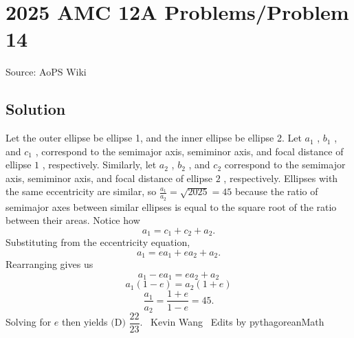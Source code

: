 \documentclass[12pt]{article}
\begin{document}
\section*{{2025 AMC 12A Problems/Problem 14}}
Source: AoPS Wiki

\subsection*{Solution}
Let the outer ellipse be ellipse 1, and the inner ellipse be ellipse 2. Let $a_1$ , $b_1$ , and $c_1$ , correspond to the semimajor axis, semiminor axis, and focal distance of ellipse $1$ , respectively. Similarly, let $a_2$ , $b_2$ , and $c_2$ correspond to the semimajor axis, semiminor axis, and focal distance of ellipse $2$ , respectively. Ellipses with the same eccentricity are similar, so $\frac{a_1}{a_2} = \sqrt{2025} = 45$ because the ratio of semimajor axes between similar ellipses is equal to the square root of the ratio between their areas. Notice how \[a_1 = c_1 + c_2 + a_2.\] Substituting from the eccentricity equation, \[a_1 = ea_1 + ea_2 + a_2.\] Rearranging gives us \[a_1 - ea_1 = ea_2 + a_2\] \[a_1(1-e) = a_2(1+e)\] \[\frac{a_1}{a_2} = \frac{1+e}{1-e} = 45.\] Solving for $e$ then yields $\boxed{\text{(D) }\dfrac{22}{23}}.$ ~Kevin Wang
~Edits by pythagoreanMath
\end{document}

